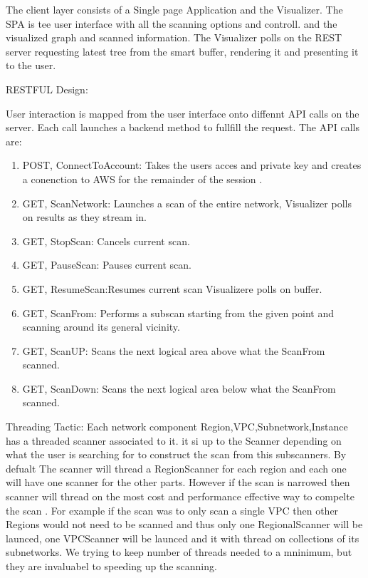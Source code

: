 \documentclass[hidelinks,a4paper,12pt]{article}
\begin{document}
The client layer consists of a Single page Application and the Visualizer. The SPA is tee user interface with all the scanning options and controll. and the visualized graph and scanned information. The Visualizer polls on the REST server requesting latest tree from the smart buffer, rendering it and presenting it to the user.

RESTFUL Design:

User interaction is mapped from the user interface onto diffennt API calls on the server. Each call launches a backend method to fullfill the request. The API calls are:
\begin{enumerate}  
					\item POST, ConnectToAccount: Takes the users acces and private key and creates a conenction to AWS for the remainder of the session .
					\item GET, ScanNetwork: Launches a scan of the entire network, Visualizer polls on results as they stream in. 
					\item GET, StopScan: Cancels current scan.
					\item GET, PauseScan: Pauses current scan.
					\item GET, ResumeScan:Resumes current scan Visualizere polls on buffer.
					\item GET, ScanFrom: Performs a subscan starting from the given point and scanning around its general vicinity.
\item GET, ScanUP: Scans the next logical area above what the ScanFrom scanned.
 \item GET, ScanDown: Scans the next logical area below what the ScanFrom scanned.
				\end{enumerate}

Threading Tactic:
Each network component Region,VPC,Subnetwork,Instance has a threaded scanner associated to it. it si up to the Scanner depending on what the user is searching for to construct the scan from this subscanners.
By defualt The scanner will thread a RegionScanner for each region and each one will have one scanner for the other parts. However if the scan is narrowed then scanner will thread on the most cost and performance effective way to compelte the scan . For example if the scan was to only scan a single VPC then other Regions would not need to be scanned and thus only one RegionalScanner will be launced, one VPCScanner will be launced and it with thread on collections of its subnetworks. We trying to keep number of threads needed to a mninimum, but they are invaluabel to speeding up the scanning.  
\end{document}
